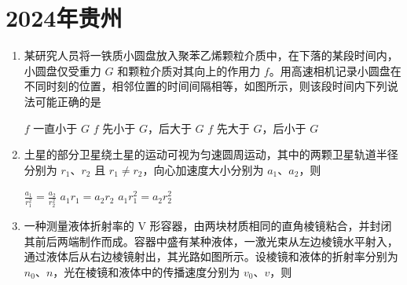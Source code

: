 \documentclass[\gkver]{gaokaozhenti}
\begin{document}
\chapter{2024年贵州}

\begin{enumerate}
\item
某研究人员将一铁质小圆盘放入聚苯乙烯颗粒介质中，在下落的某段时间内，小圆盘仅受重力 $G$ 和颗粒介质对其向上的作用力 $f$。用高速相机记录小圆盘在不同时刻的位置，相邻位置的时间间隔相等，如图所示，则该段时间内下列说法可能正确的是


{$f$ 一直小于 $G$}
{$f$ 先小于 $G$，后大于 $G$}
{$f$ 先大于 $G$，后小于 $G$}


\item
土星的部分卫星绕土星的运动可视为匀速圆周运动，其中的两颗卫星轨道半径分别为 $r_{1}$、$r_{2}$ 且 $r_{1} \neq r_{2}$，向心加速度大小分别为 $a_{1}$、$a_{2}$，则

{$\frac{a_{1}}{r_{1}^{2}} = \frac{a_{2}}{r_{2}^{2}}$}
{$a_{1}r_{1} = a_{2}r_{2}$}
{$a_{1}r_{1}^{2} = a_{2}r_{2}^{2}$}


\item
一种测量液体折射率的 V 形容器，由两块材质相同的直角棱镜粘合，并封闭其前后两端制作而成。容器中盛有某种液体，一激光束从左边棱镜水平射入，通过液体后从右边棱镜射出，其光路如图所示。设棱镜和液体的折射率分别为 $n_{0}$、$n$，光在棱镜和液体中的传播速度分别为 $v_{0}$、$v$，则


\end{enumerate}
\end{document}

